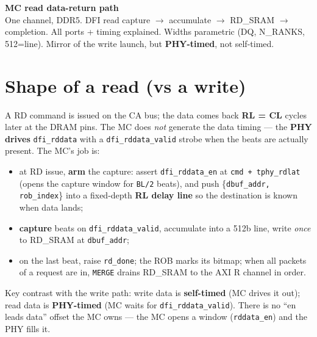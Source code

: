 \documentclass[10pt]{article}
\begin{document}
\begin{center}
{\LARGE\textbf{MC read data-return path}}\\[2pt]
{\small One channel, DDR5. DFI read capture $\rightarrow$ accumulate $\rightarrow$ RD\_SRAM $\rightarrow$
completion. All ports + timing explained. Widths parametric (DQ, N\_RANKS, 512=line). Mirror of the
write launch, but \textbf{PHY-timed}, not self-timed.}
\end{center}

\section{Shape of a read (vs a write)}
A RD command is issued on the CA bus; the data comes back \textbf{RL = CL} cycles later at the DRAM
pins. The MC does \emph{not} generate the data timing --- the \textbf{PHY drives} \texttt{dfi\_rddata}
with a \texttt{dfi\_rddata\_valid} strobe when the beats are actually present. The MC's job is:
\begin{itemize}
\item at RD issue, \textbf{arm} the capture: assert \texttt{dfi\_rddata\_en} at \texttt{cmd + tphy\_rdlat}
      (opens the capture window for \texttt{BL/2} beats), and push \{\texttt{dbuf\_addr, rob\_index}\}
      into a fixed-depth \textbf{RL delay line} so the destination is known when data lands;
\item \textbf{capture} beats on \texttt{dfi\_rddata\_valid}, accumulate into a 512b line, write \emph{once}
      to RD\_SRAM at \texttt{dbuf\_addr};
\item on the last beat, raise \texttt{rd\_done}; the ROB marks its bitmap; when all packets of a request
      are in, \texttt{MERGE} drains RD\_SRAM to the AXI R channel in order.
\end{itemize}
Key contrast with the write path: write data is \textbf{self-timed} (MC drives it out); read data is
\textbf{PHY-timed} (MC waits for \texttt{dfi\_rddata\_valid}). There is no ``en leads data'' offset the
MC owns --- the MC opens a window (\texttt{rddata\_en}) and the PHY fills it.
\end{document}
